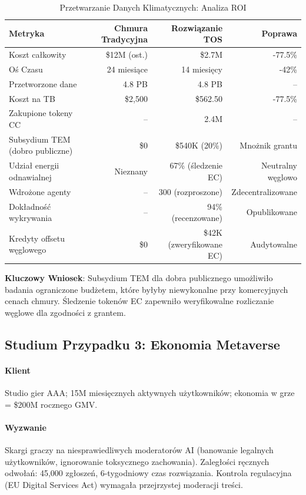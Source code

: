 \documentclass[11pt]{article}
\begin{document}
\begin{table}[H]
\centering
\caption{Przetwarzanie Danych Klimatycznych: Analiza ROI}
\label{tab:climate-roi}
\begin{tabular}{@{}lrrr@{}}
\toprule
\textbf{Metryka} & \textbf{Chmura Tradycyjna} & \textbf{Rozwiązanie TOS} & \textbf{Poprawa} \\ \midrule
Koszt całkowity & \$12M (ost.) & \$2.7M & -77.5\% \\
Oś Czasu & 24 miesiące & 14 miesięcy & -42\% \\
Przetworzone dane & 4.8 PB & 4.8 PB & -- \\
Koszt na TB & \$2,500 & \$562.50 & -77.5\% \\
Zakupione tokeny CC & -- & 2.4M & -- \\
Subsydium TEM (dobro publiczne) & \$0 & \$540K (20\%) & Mnożnik grantu \\
Udział energii odnawialnej & Nieznany & 67\% (śledzenie EC) & Neutralny węglowo \\
Wdrożone agenty & -- & 300 (rozproszone) & Zdecentralizowane \\
Dokładność wykrywania & -- & 94\% (recenzowane) & Opublikowane \\
Kredyty offsetu węglowego & \$0 & \$42K (zweryfikowane EC) & Audytowalne \\
\bottomrule
\end{tabular}
\end{table}

\textbf{Kluczowy Wniosek}: Subsydium TEM dla dobra publicznego umożliwiło badania ograniczone budżetem, które byłyby niewykonalne przy komercyjnych cenach chmury. Śledzenie tokenów EC zapewniło weryfikowalne rozliczanie węglowe dla zgodności z grantem.

\subsection{Studium Przypadku 3: Ekonomia Metaverse}

\paragraph{Klient} Studio gier AAA; 15M miesięcznych aktywnych użytkowników; ekonomia w grze = \$200M rocznego GMV.

\paragraph{Wyzwanie} Skargi graczy na niesprawiedliwych moderatorów AI (banowanie legalnych użytkowników, ignorowanie toksycznego zachowania). Zaległości ręcznych odwołań: 45,000 zgłoszeń, 6-tygodniowy czas rozwiązania. Kontrola regulacyjna (EU Digital Services Act) wymagała przejrzystej moderacji treści.
\end{document}
